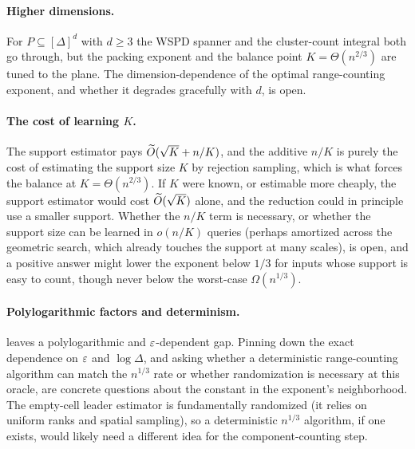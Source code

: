 \paragraph{Higher dimensions.}
For $P\subseteq[\Delta]^d$ with $d\ge3$ the WSPD spanner and the cluster-count integral both go through,
but the packing exponent and the balance point $K=\Theta(n^{2/3})$ are tuned to the plane. The
dimension-dependence of the optimal range-counting exponent, and whether it degrades gracefully with $d$,
is open.

\paragraph{The cost of learning $K$.}
The support estimator pays $\widetilde{O}(\sqrt K+n/K)$, and the additive $n/K$ is purely the cost of estimating
the support size $K$ by rejection sampling, which is what forces the balance at $K=\Theta(n^{2/3})$. If $K$
were known, or estimable more cheaply, the support estimator would cost $\widetilde{O}(\sqrt K)$ alone, and the
reduction could in principle use a smaller support. Whether the $n/K$ term is necessary, or whether the
support size can be learned in $o(n/K)$ queries (perhaps amortized across the geometric search, which
already touches the support at many scales), is open, and a positive answer might lower the exponent below
$1/3$ for inputs whose support is easy to count, though never below the worst-case $\Omega(n^{1/3})$.

\paragraph{Polylogarithmic factors and determinism.}
 leaves a polylogarithmic and $\varepsilon$-dependent gap. Pinning down the exact dependence on
$\varepsilon$ and $\log\Delta$, and asking whether a deterministic range-counting algorithm can match the
$n^{1/3}$ rate or whether randomization is necessary at this oracle, are concrete questions about the
constant in the exponent's neighborhood. The empty-cell leader estimator is fundamentally randomized (it
relies on uniform ranks and spatial sampling), so a deterministic $n^{1/3}$ algorithm, if one exists,
would likely need a different idea for the component-counting step.
